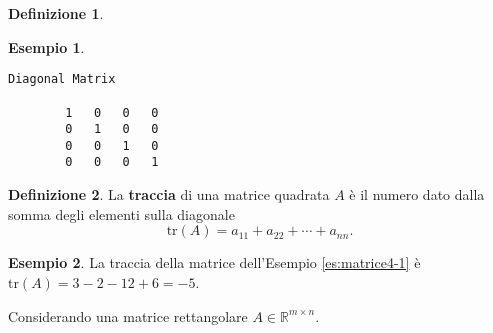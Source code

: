\documentclass{book}
\theoremstyle{definition}
\newtheorem{defi}{Definizione}[section]
\newtheorem{es}{Esempio}[section]
\theoremstyle{plain}
\begin{document}
\begin{defi}
\begin{itemize}
\begin{es}
\begin{lstlisting}[caption=generare una matrice identità in GNU/Octave]
        Diagonal Matrix

        1   0   0   0
        0   1   0   0
        0   0   1   0
        0   0   0   1
      \end{lstlisting}
    \end{es}
  \end{itemize}
\end{defi}
\begin{defi}
  \label{defi:matrice5}
  La \textbf{traccia} di una matrice quadrata $A$ è il numero dato dalla
  somma degli elementi sulla diagonale
  \begin{equation*}
    \mathrm{tr}(A)=a_{11}+a_{22}+\cdots+a_{nn}.
  \end{equation*}
\end{defi}
\begin{es}
  La traccia della matrice dell'Esempio \ref{es:matrice4-1} è
  $\mathrm{tr}(A)=3-2-12+6=-5$.
\end{es}
Considerando una matrice rettangolare $A\in\mathds{R}^{m\times n}$.
\end{document}
